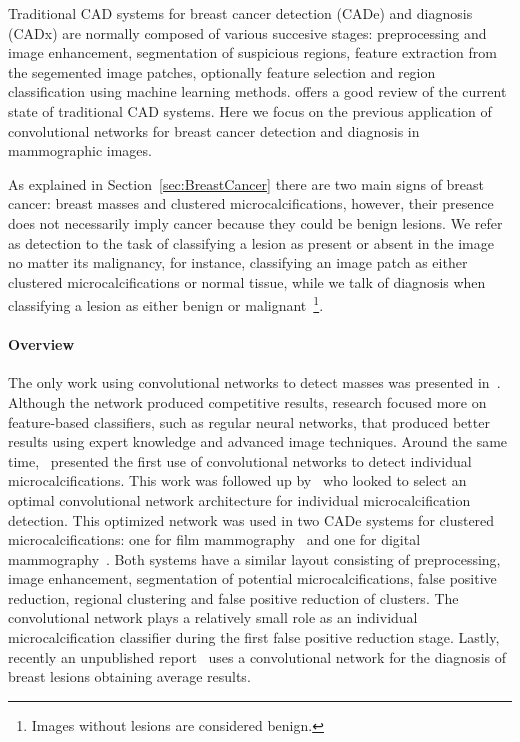 Traditional CAD systems for breast cancer detection (CADe) and diagnosis (CADx) are normally composed of various succesive stages: preprocessing and image enhancement, segmentation of suspicious regions, feature extraction from the segemented image patches, optionally feature selection and region classification using machine learning methods. \cite{Tang2009} offers a good review of the current state of traditional CAD systems. Here we focus on the previous application of convolutional networks for breast cancer detection and diagnosis in mammographic images.

As explained in Section~\ref{sec:BreastCancer} there are two main signs of breast cancer: breast masses and clustered microcalcifications, however, their presence does not necessarily imply cancer because they could be benign lesions. We refer as detection to the task of classifying a lesion as present or absent in the image no matter its malignancy, for instance, classifying an image patch as either clustered microcalcifications or normal tissue, while we talk of diagnosis when classifying a lesion as either benign or malignant~\footnote{Images without lesions are considered benign.}.

\paragraph{Overview}
The only work using convolutional networks to detect masses was presented in~\cite{Sahiner1996}. Although the network produced competitive results, research focused more on feature-based classifiers, such as regular neural networks, that produced better results using expert knowledge and advanced image techniques. Around the same time,~\cite{Lo1995} presented the first use of convolutional networks to detect individual microcalcifications. This work was followed up by~\cite{Gurcan2002} who looked to select an optimal convolutional network architecture for individual microcalcification detection. This optimized network was used in two CADe systems for clustered microcalcifications: one for film mammography~\cite{Gurcan2002} and one for digital mammography~\cite{Ge2006}. Both systems have a similar layout consisting of preprocessing, image enhancement, segmentation of potential microcalcifications, false positive reduction, regional clustering and false positive reduction of clusters. The convolutional network plays a relatively small role as an individual microcalcification classifier during the first false positive reduction stage. Lastly, recently an unpublished report~\cite{Agarwal2015} uses a convolutional network for the diagnosis of breast lesions obtaining average results.

